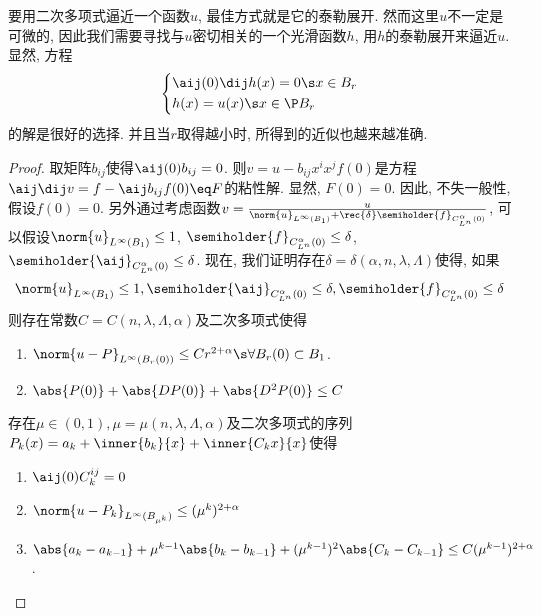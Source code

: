 \begin{remark}
    要用二次多项式逼近一个函数$u$, 最佳方式就是它的泰勒展开.  然而这里$u$不一定是可微的, 因此我们需要寻找与$u$密切相关的一个光滑函数$h$, 用$h$的泰勒展开来逼近$u$.  显然, 方程
    \begin{equation}
        \left\{
            \begin{aligned}
                &\aij(0) \dij h(x) =0 \s x \in B_r \\
                &h(x)=u(x) \s x \in \P B_r
            \end{aligned}
        \right.  
    \end{equation}
    的解是很好的选择.  并且当$r$取得越小时, 所得到的近似也越来越准确.  
\end{remark}
\begin{proof}
    取矩阵$b_{ij}$使得$\aij(0)b_{ij}=0$.  则$v=u-b_{ij} x^ix^jf(0)$是方程$\aij \dij v=f-\aij b_{ij}f(0)\eq F$的粘性解.  显然, $F(0)=0$.  因此, 不失一般性, 假设$f(0)=0$.  另外通过考虑函数$v=\frac{u}{\norm{u}_{L^\infty(B_1)}+\rec{\delta}\semiholder{f}_{C^\alpha_{L^n}(0)}}$, 可以假设$\norm{u}_{L^\infty(B_1)} \le 1$, $\semiholder{f}_{C^\alpha_{L^n}(0)} \le \delta$, $\semiholder{\aij}_{C^\alpha_{L^n}(0)} \le \delta$.  现在, 我们证明存在$\delta=\delta(\alpha, n, \lambda, \Lambda)$使得, 如果
    \begin{equation}
        \norm{u}_{{L^\infty}(B_1)} \le 1, \semiholder{\aij}_{C^\alpha_{L^n}(0)} \le \delta, \semiholder{f}_{C^\alpha_{L^n}(0)} \le \delta
    \end{equation}
    则存在常数$C=C(n, \lambda, \Lambda, \alpha)$及二次多项式使得
    \begin{enumerate}
        \item $\norm{u-P}_{L^\infty(B_r(0))} \le Cr^{2+\alpha} \s \forall B_r(0) \subset B_1$.  
        \item $\abs{P(0)}+\abs{DP(0)}+\abs{D^2P(0)} \le C$
    \end{enumerate}
    \begin{claim}
        存在$\mu \in (0, 1), \mu=\mu(n, \lambda, \Lambda, \alpha)$及二次多项式的序列$P_k(x)=a_k+\inner{b_k}{x}+\inner{C_kx}{x}$使得
        \begin{enumerate}
            \item $\aij(0)C_k^{ij}=0$
            \item $\norm{u-P_k}_{L^\infty(B_{\mu^k})} \le (\mu^k)^{2+\alpha}$
            \item \label{lconver}$\abs{a_k-a_{k-1}}+\mu^{k-1}\abs{b_k-b_{k-1}}+(\mu^{k-1})^2\abs{C_k-C_{k-1}} \le C(\mu^{k-1})^{2+\alpha}$.  

\end{enumerate}
\end{claim}
\end{proof}
